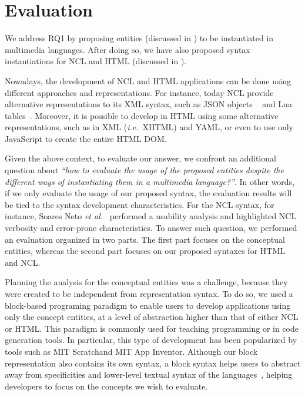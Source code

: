 \chapter{Evaluation}
\label{chp:evaluation}

We address RQ1 by proposing entities (discussed in ) to be
instantiated
in multimedia languages. After doing so, we have also proposed syntax
instantiations for NCL and HTML (discussed in ).

Nowadays, the development of NCL and HTML applications can be done using
different approaches and representations. For instance, today NCL provide
alternative representations to its XML syntax, such as JSON objects
~\cite{silva_jns:_2013} and Lua tables~\cite{moraes_lua2ncl:_2016}. Moreover,
it is possible to develop in HTML using some alternative representations, such
as in XML (\textit{i.e.}~XHTML) and YAML, or even to use only JavaScript to
create the entire HTML DOM.

Given the above context, to evaluate our answer, we confront an additional
question about \textit{“how to evaluate the usage of the proposed entities
despite the different ways of instantiating them in a multimedia language?”}.
In other words, if we only evaluate the usage of our proposed syntax, the
evaluation results will be tied to the syntax development characteristics. For
the NCL syntax, for instance, Soares Neto \textit{et
al.}~\cite{de_salles_soares_neto_linguagens_2008}
performed a usability analysis and highlighted NCL verbosity and error-prone
characteristics. To answer such question, we performed an evaluation organized
in two parts. The first part focuses on the conceptual entities, whereas the
second part focuses on our proposed syntaxes for HTML and NCL.

Planning the analysis for the conceptual entities was a challenge, because they
were created to be independent from representation syntax. To do so, we used a
block-based programing paradigm to enable users to develop applications using
only the concept entities, at a level of abstraction higher than that of either
NCL or HTML. This paradigm is commonly used for teaching programming or in code
generation tools. In particular, this type of development has been popularized
by tools such as MIT Scratch\footnotemark and MIT App Inventor\footnotemark.
Although our block representation also contains its own syntax, a block syntax
helps users to abstract away from specificities and lower-level textual syntax
of the languages~\cite{shapiro_beyond_2016}, helping developers to focus on the
concepts we wish to evaluate.

